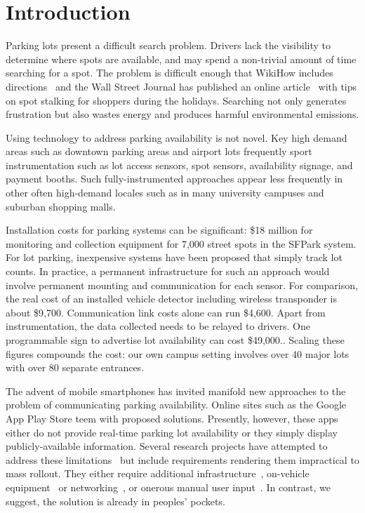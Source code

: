 \section{Introduction}


Parking lots present a difficult search problem. Drivers lack the visibility
to determine where spots are available, and may spend a non-trivial amount of
time searching for a spot. The problem is difficult enough that WikiHow
includes directions~\cite{wikihow-park} and the Wall Street Journal has
published an online article~\cite{wsj-park} with tips on spot stalking for
shoppers during the holidays. Searching not only generates frustration but
also wastes energy and produces harmful environmental emissions.

Using technology to address parking availability is not novel.  Key high
demand areas such as downtown parking areas and airport lots frequently sport
instrumentation such as lot access sensors, spot sensors, availability
signage, and payment booths.  Such fully-instrumented approaches appear less
frequently in other often high-demand locales such as in many university
campuses and suburban shopping malls.

Installation costs for parking systems can be significant:  \$18 million for
monitoring and collection equipment for 7,000 street spots in the SFPark
system.\cite{sf-park}  For lot parking, inexpensive systems have been
proposed that simply track lot counts.\cite{lot-count}  In practice, a
permanent infrastructure for such an approach would involve permanent
mounting and communication for each sensor.  For comparison, the real cost
of an installed vehicle detector including wireless transponder is about
\$9,700.\cite{car-detect}  Communication link costs alone can run
\$4,600.\cite{mstp-park}  Apart from instrumentation, the data collected
needs to be relayed to drivers.  One programmable sign to advertise lot
availability can cost \$49,000.\cite{mstp-park}.  Scaling these figures
compounds the cost:  our own campus setting involves over 40 major lots
with over 80 separate entrances.

The advent of mobile smartphones has invited manifold new approaches to the
problem of communicating parking availability.  Online sites such as the
Google App Play Store teem with proposed solutions.  Presently, however, these
apps either do not provide real-time parking lot availability or they simply
display publicly-available information. Several research projects have
attempted to address these limitations~\cite{4212497, Chen:2012:COS,
Delot:2009:CRP, 5062057, Mathur:2010:PDS} but include requirements rendering
them impractical to mass rollout.  They either require additional
infrastructure~\cite{5062057}, on-vehicle equipment~\cite{Mathur:2010:PDS}
or networking~\cite{Delot:2009:CRP, Mathur:2010:PDS}, or onerous manual user
input~\cite{Chen:2012:COS}. In contrast, we suggest, the solution is already
in peoples' pockets.

